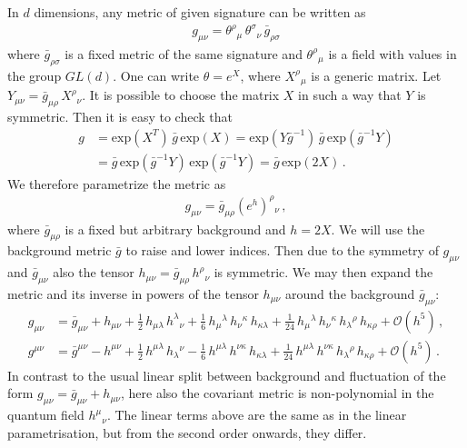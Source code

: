 \documentclass[11pt]{book}
\numberwithin{equation}{chapter}
\begin{document}
\begin{appendices}
In $d$ dimensions, any metric of given signature can be written as
\begin{align}
  g_{\mu\nu} = \theta^\rho{}_\mu \, \theta^\sigma{}_\nu  \, \bar g_{\rho\sigma}
\end{align}
where $\bar g_{\rho \sigma}$ is a fixed metric of the same signature
and $\theta^\rho{}_\mu$ is a field with values in the group $GL(d)$.
One can write $\theta=e^X$, where $X^\rho{}_\mu$ is a generic matrix.
Let $Y_{\mu\nu} = \bar g_{\mu\rho} \, X^\rho{}_\nu$.
It is possible to choose the matrix $X$ in such a way that $Y$ is symmetric.
Then it is easy to check that
\begin{align}
  g &= \mathrm{exp}( X^T ) \, \bar g \, \mathrm{exp}(X)
    = \mathrm{exp}(Y \bar{g}^{-1}) \, \bar g \, \mathrm{exp}(\bar g^{-1}Y) \nonumber \\
    &= \bar g \, \mathrm{exp}(\bar g^{-1}Y) \, \mathrm{exp}(\bar g^{-1}Y)
    = \bar g \, \mathrm{exp}(2X) \,.
\end{align}
We therefore parametrize the metric as
\begin{align}
  \label{decomp}
  g_{\mu\nu} = \bar g_{\mu\rho} (e^h)^\rho{}_\nu \,,
\end{align}
where $\bar g_{\mu\rho}$ is a fixed but arbitrary background and $h=2X$.
We will use the background metric $\bar g$ to raise and lower indices.
Then due to the symmetry of $g_{\mu\nu}$ and $\bar g_{\mu\nu}$ also the tensor
$h_{\mu\nu}=\bar g_{\mu\rho} \, h^\rho{}_\nu$ is symmetric.
We may then expand the metric and its inverse in powers of the tensor
$h_{\mu\nu}$ around the background $\bar g_{\mu\nu}$:
\begin{align}
  g_{\mu\nu} &= \bar g_{\mu\nu}
  + h_{\mu\nu}
  + \frac{1}{2} \, h_{\mu\lambda} \, h^\lambda{}_\nu
  + \frac{1}{6} \, h_{\mu}{}^\lambda \, h_\nu{}^\kappa \, h_{\kappa\lambda}
  + \frac{1}{24} \, h_{\mu}{}^\lambda \, h_\nu{}^\kappa \, h_{\lambda}{}^\rho \, h_{\kappa\rho}
  + \mathcal O(h^5) \,, \\
  g^{\mu\nu} &= \bar g^{\mu\nu}
  - h^{\mu\nu}
  + \frac{1}{2} \, h^{\mu\lambda} \, h_\lambda{}^\nu
  - \frac{1}{6} \, h^{\mu\lambda} \, h^{\nu\kappa} \, h_{\kappa\lambda}
  + \frac{1}{24} \, h^{\mu\lambda} \, h^{\nu\kappa} \, h_{\lambda}{}^\rho \, h_{\kappa\rho}
  + \mathcal O(h^5) \,.
\end{align}
In contrast to the usual linear split between background and fluctuation of the form
$g_{\mu\nu} = \bar g_{\mu\nu} + h_{\mu\nu}$, here also the covariant metric is
non-polynomial in the quantum field $h^\mu{}_\nu$.
The linear terms above are the same as in the linear parametrisation,
but from the second order onwards, they differ.



\end{appendices}
\end{document}
